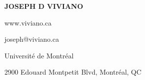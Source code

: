 \documentclass[a4paper,12pt,oneside]{book}
\begin{document}
\thispagestyle{empty} %

\noindent
\begin{minipage}{0.95\linewidth}
    \begin{multicols}{2}

        \vspace*{\fill}
        \noindent\huge\leftskip=0.25in\textbf{JOSEPH D VIVIANO}
        \vspace*{\fill}

        \columnbreak\normalsize
        \hfill www.viviano.ca\

        \hfill joseph@viviano.ca\

        \hfill Universit\'e de Montr\'eal\

        \hfill 2900 Edouard Montpetit Blvd, Montr\'eal, QC\

    \end{multicols}
    \vspace{0in}
\end{minipage}
\vspace{0.1in}
\end{document}
